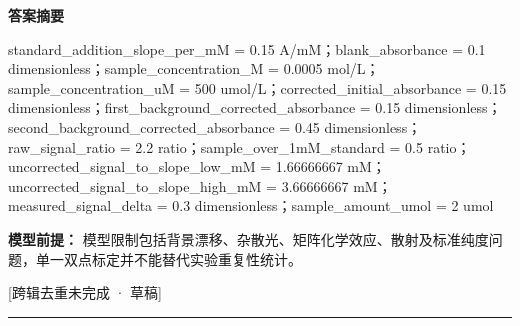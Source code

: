 \documentclass[UTF8,11pt,a4paper]{ctexart}
\begin{document}
\noindent\textbf{答案摘要}\par
standard\_addition\_slope\_per\_mM = 0.15 A/mM；blank\_absorbance = 0.1 dimensionless；sample\_concentration\_M = 0.0005 mol/L；sample\_concentration\_uM = 500 umol/L；corrected\_initial\_absorbance = 0.15 dimensionless；first\_background\_corrected\_absorbance = 0.15 dimensionless；second\_background\_corrected\_absorbance = 0.45 dimensionless；raw\_signal\_ratio = 2.2 ratio；sample\_over\_1mM\_standard = 0.5 ratio；uncorrected\_signal\_to\_slope\_low\_mM = 1.66666667 mM；uncorrected\_signal\_to\_slope\_high\_mM = 3.66666667 mM；measured\_signal\_delta = 0.3 dimensionless；sample\_amount\_umol = 2 umol\par
\noindent\textbf{模型前提：}
模型限制包括背景漂移、杂散光、矩阵化学效应、散射及标准纯度问题，单一双点标定并不能替代实验重复性统计。\par
\noindent\textcolor{red!65!black}{[跨辑去重未完成 · 草稿]} \par
\medskip\hrule\medskip
{}
\end{document}
